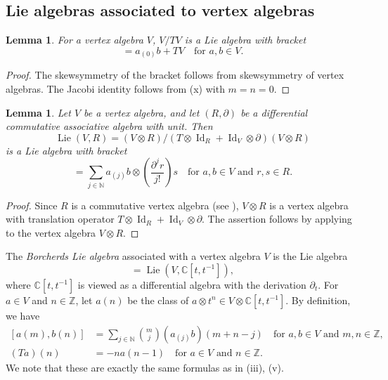 \documentclass[a4paper, 12pt, reqno]{amsart}
\newtheorem{lemma}[theorem]{Lemma}
\theoremstyle{remark}
\numberwithin{equation}{subsection}
\DeclareMathOperator{\Id}{Id}
\DeclareMathOperator{\Lie}{Lie}
\begin{document}
\subsection{Lie algebras associated to vertex algebras}
\label{sec:lie-algebr-assoc}

\begin{lemma}
  \label{lmm:12}
  For a vertex algebra $V$, $V/TV$ is a Lie algebra with bracket
  \begin{equation*}
    [a + TV, b + TV] = a_{(0)}b + TV \quad \text{for }a, b \in V.
  \end{equation*}
\end{lemma}

\begin{proof}
  The skewsymmetry of the bracket follows from skewsymmetry of vertex algebras.
  The Jacobi identity follows from (x) with $m = n = 0$.
\end{proof}

\begin{lemma}
  \label{lmm:13}
  Let $V$ be a vertex algebra, and let $(R, \partial)$ be a differential commutative associative algebra with unit.
  Then
  \begin{equation*}
    \Lie(V, R) = (V \otimes R)/(T\otimes\Id_R + \Id_V\otimes\partial)(V \otimes R)
  \end{equation*}
  is a Lie algebra with bracket
  \begin{equation*}
    [a\otimes r, b\otimes s] = \sum_{j \in \mathbb{N}}a_{(j)}b\otimes\left(\frac{\partial^jr}{j!}\right)s \quad \text{for }a, b \in V\text{ and }r, s \in R.
  \end{equation*}
\end{lemma}

\begin{proof}
  Since $R$ is a commutative vertex algebra (see ), $V \otimes R$ is a vertex algebra with translation operator $T\otimes\Id_R + \Id_V\otimes\partial$.
  The assertion follows by applying  to the vertex algebra $V \otimes R$.
\end{proof}

The \emph{Borcherds Lie algebra} associated with a vertex algebra $V$ is the Lie algebra
\begin{equation*}
  [V] = \Lie(V, \mathbb{C}[t, t^{-1}]),
\end{equation*}
where $\mathbb{C}[t, t^{-1}]$ is viewed as a differential algebra with the derivation $\partial_t$.
For $a \in V$ and $n \in \mathbb{Z}$, let $a(n)$ be the class of $a\otimes t^n \in V \otimes \mathbb{C}[t, t^{-1}]$.
By definition, we have
\begin{align}
  \label{eq:24}
  [a(m), b(n)] &= \sum_{j \in \mathbb{N}}\binom{m}{j}(a_{(j)}b)(m + n - j) \quad \text{for }a, b \in V\text{ and }m, n \in \mathbb{Z}, \\
  \label{eq:25}
  (Ta)(n) &= -na(n - 1) \quad \text{for }a \in V\text{ and }n \in \mathbb{Z}.
\end{align}
We note that these are exactly the same formulas as in (iii), (v).
\end{document}
